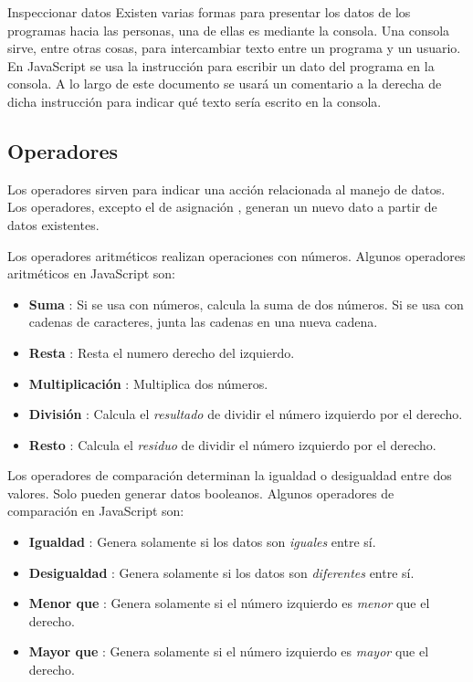 \documentclass{article}
\newcommand{\code}[1]{\tcbox{\texttt{#1}}}
\newcommand{\codejs}[1]{\tcbox{\lstinline[style=ES6]{#1}}}
\newcommand{\operator}[2]{\item \textbf{#1} \codejs{#2}:}
\begin{document}


\begin{bclogo}[logo=\bcinfo, couleurBarre=orange, noborder=true, couleur=white]{Inspeccionar datos}
Existen varias formas para presentar los datos de los programas hacia las personas, una de ellas es mediante la consola. Una consola sirve, entre otras cosas, para intercambiar texto entre un programa y un usuario. En JavaScript se usa la instrucción \codejs{console.log( /* dato */ )} para escribir un dato del programa en la consola. A lo largo de este documento se usará un comentario a la derecha de dicha instrucción para indicar qué texto sería escrito en la consola.
\end{bclogo}

\subsection*{Operadores}
Los operadores sirven para indicar una acción relacionada al manejo de datos. Los operadores, excepto el de asignación \code{=}, generan un nuevo dato a partir de datos existentes.

\medskip
Los operadores aritméticos realizan operaciones con números. Algunos operadores aritméticos en JavaScript son:
\begin{itemize}
  \operator{Suma}{+} Si se usa con números, calcula la suma de dos números. Si se usa con cadenas de caracteres, junta las cadenas en una nueva cadena.
  \operator{Resta}{-} Resta el numero derecho del izquierdo.
  \operator{Multiplicación}{*} Multiplica dos números.
  \operator{División}{/} Calcula el \textit{resultado} de dividir el número izquierdo por el derecho.
  \operator{Resto}{\%} Calcula el \textit{residuo} de dividir el número izquierdo por el derecho.
\end{itemize}


\medskip
Los operadores de comparación determinan la igualdad o desigualdad entre dos valores. Solo pueden generar datos booleanos. Algunos operadores de comparación en JavaScript son:
\begin{itemize}
  \operator{Igualdad}{===} Genera \code{true} solamente si los datos son \textit{iguales} entre sí.
  \operator{Desigualdad}{!==} Genera \code{true} solamente si los datos son \textit{diferentes} entre sí.
  \operator{Menor que}{<} Genera \code{true} solamente si el número izquierdo es \textit{menor} que el derecho.
  \operator{Mayor que}{>} Genera \code{true} solamente si el número izquierdo es \textit{mayor} que el derecho.
\end{itemize}

\end{document}
